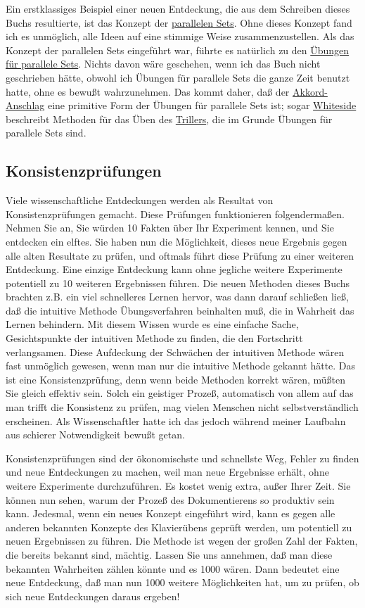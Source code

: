 Ein erstklassiges Beispiel einer neuen Entdeckung, die aus dem Schreiben dieses Buchs resultierte, ist das Konzept der \hyperref[c1ii11]{parallelen Sets}.
Ohne dieses Konzept fand ich es unmöglich, alle Ideen auf eine stimmige Weise zusammenzustellen.
Als das Konzept der parallelen Sets eingeführt war, führte es natürlich zu den \hyperref[c1iii7b]{Übungen für parallele Sets}.
Nichts davon wäre geschehen, wenn ich das Buch nicht geschrieben hätte, obwohl ich Übungen für parallele Sets die ganze Zeit benutzt hatte, ohne es bewußt wahrzunehmen.
Das kommt daher, daß der \hyperref[c1ii9]{Akkord-Anschlag} eine primitive Form der Übungen für parallele Sets ist; sogar \hyperref[Whiteside]{Whiteside} beschreibt Methoden für das Üben des \hyperref[c1iii3]{Trillers}, die im Grunde Übungen für parallele Sets sind.


\subsection{Konsistenzprüfungen}
\label{c3_3e}

Viele wissenschaftliche Entdeckungen werden als Resultat von Konsistenzprüfungen gemacht.
Diese Prüfungen funktionieren folgendermaßen.
Nehmen Sie an, Sie würden 10 Fakten über Ihr Experiment kennen, und Sie entdecken ein elftes.
Sie haben nun die Möglichkeit, dieses neue Ergebnis gegen alle alten Resultate zu prüfen, und oftmals führt diese Prüfung zu einer weiteren Entdeckung.
Eine einzige Entdeckung kann ohne jegliche weitere Experimente potentiell zu 10 weiteren Ergebnissen führen.
Die neuen Methoden dieses Buchs brachten z.B. ein viel schnelleres Lernen hervor, was dann darauf schließen ließ, daß die intuitive Methode Übungsverfahren beinhalten muß, die in Wahrheit das Lernen behindern.
Mit diesem Wissen wurde es eine einfache Sache, Gesichtspunkte der intuitiven Methode zu finden, die den Fortschritt verlangsamen.
Diese Aufdeckung der Schwächen der intuitiven Methode wären fast unmöglich gewesen, wenn man nur die intuitive Methode gekannt hätte.
Das ist eine Konsistenzprüfung, denn wenn beide Methoden korrekt wären, müßten Sie gleich effektiv sein.
Solch ein geistiger Prozeß, automatisch von allem auf das man trifft die Konsistenz zu prüfen, mag vielen Menschen nicht selbstverständlich erscheinen.
Als Wissenschaftler hatte ich das jedoch während meiner Laufbahn aus schierer Notwendigkeit bewußt getan.

Konsistenzprüfungen sind der ökonomischste und schnellste Weg, Fehler zu finden und neue Entdeckungen zu machen, weil man neue Ergebnisse erhält, ohne weitere Experimente durchzuführen.
Es kostet wenig extra, außer Ihrer Zeit.
Sie können nun sehen, warum der Prozeß des Dokumentierens so produktiv sein kann.
Jedesmal, wenn ein neues Konzept eingeführt wird, kann es gegen alle anderen bekannten Konzepte des Klavierübens geprüft werden, um potentiell zu neuen Ergebnissen zu führen.
Die Methode ist wegen der großen Zahl der Fakten, die bereits bekannt sind, mächtig.
Lassen Sie uns annehmen, daß man diese bekannten Wahrheiten zählen könnte und es 1000 wären.
Dann bedeutet eine neue Entdeckung, daß man nun 1000 weitere Möglichkeiten hat, um zu prüfen, ob sich neue Entdeckungen daraus ergeben!

